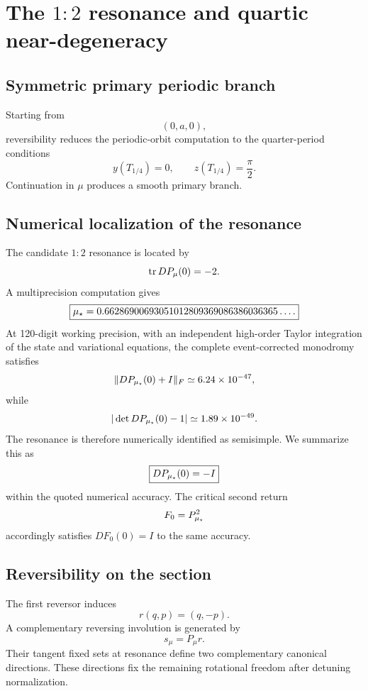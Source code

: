 \section{The \texorpdfstring{\(1{:}2\)}{1:2} resonance and quartic near-degeneracy}
\label{sec:resonance}

\subsection{Symmetric primary periodic branch}

Starting from
\[
(0,a,0),
\]
reversibility reduces the periodic-orbit computation to the quarter-period conditions
\[
y(T_{1/4})=0,\qquad
z(T_{1/4})=\frac{\pi}{2}.
\]
Continuation in \(\mu\) produces a smooth primary branch.

\subsection{Numerical localization of the resonance}

The candidate \(1{:}2\) resonance is located by
\[
\operatorname{tr} DP_\mu(0)=-2.
\]
A multiprecision computation gives
\begin{equation}
\boxed{
\mu_\star
=0.66286900693051012809369086386036365\ldots.
}
\label{eq:mu-star}
\end{equation}
At 120-digit working precision, with an independent high-order Taylor integration of the state and variational equations, the complete event-corrected monodromy satisfies
\[
\|DP_{\mu_\star}(0)+I\|_F\simeq6.24\times10^{-47},
\]
while
\[
|\det DP_{\mu_\star}(0)-1|\simeq1.89\times10^{-49}.
\]
The resonance is therefore numerically identified as semisimple.  We summarize this as
\begin{equation}
\boxed{
DP_{\mu_\star}(0)=-I
}
\label{eq:resonance}
\end{equation}
within the quoted numerical accuracy.  The critical second return
\[
F_0=P_{\mu_\star}^2
\]
accordingly satisfies \(DF_0(0)=I\) to the same accuracy.

\subsection{Reversibility on the section}

The first reversor induces
\[
r(q,p)=(q,-p).
\]
A complementary reversing involution is generated by
\[
s_\mu=P_\mu r.
\]
Their tangent fixed sets at resonance define two complementary canonical directions. These directions fix the remaining rotational freedom after detuning normalization.

